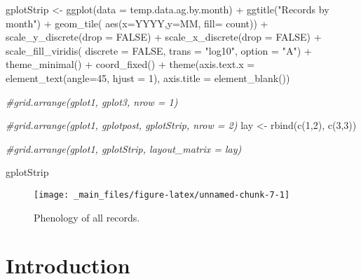 \documentclass[
]{article}
\newenvironment{Shaded}{\begin{snugshade}}{\end{snugshade}}
\newcommand{\AttributeTok}[1]{\textcolor[rgb]{0.77,0.63,0.00}{#1}}
\newcommand{\CommentTok}[1]{\textcolor[rgb]{0.56,0.35,0.01}{\textit{#1}}}
\newcommand{\ConstantTok}[1]{\textcolor[rgb]{0.00,0.00,0.00}{#1}}
\newcommand{\DecValTok}[1]{\textcolor[rgb]{0.00,0.00,0.81}{#1}}
\newcommand{\FunctionTok}[1]{\textcolor[rgb]{0.00,0.00,0.00}{#1}}
\newcommand{\NormalTok}[1]{#1}
\newcommand{\OtherTok}[1]{\textcolor[rgb]{0.56,0.35,0.01}{#1}}
\newcommand{\SpecialCharTok}[1]{\textcolor[rgb]{0.00,0.00,0.00}{#1}}
\newcommand{\StringTok}[1]{\textcolor[rgb]{0.31,0.60,0.02}{#1}}
\begin{document}
\begin{Shaded}
\begin{Highlighting}[]
\NormalTok{gplotStrip }\OtherTok{\textless{}{-}} \FunctionTok{ggplot}\NormalTok{(}\AttributeTok{data =}\NormalTok{ temp.data.ag.by.month)  }\SpecialCharTok{+}
    \FunctionTok{ggtitle}\NormalTok{(}\StringTok{"Records by month"}\NormalTok{) }\SpecialCharTok{+}
  \FunctionTok{geom\_tile}\NormalTok{( }
                      \FunctionTok{aes}\NormalTok{(}\AttributeTok{x=}\NormalTok{YYYY,}\AttributeTok{y=}\NormalTok{MM, }\AttributeTok{fill=}\NormalTok{ count))  }\SpecialCharTok{+}
   \FunctionTok{scale\_y\_discrete}\NormalTok{(}\AttributeTok{drop =} \ConstantTok{FALSE}\NormalTok{) }\SpecialCharTok{+} 
  \FunctionTok{scale\_x\_discrete}\NormalTok{(}\AttributeTok{drop =} \ConstantTok{FALSE}\NormalTok{) }\SpecialCharTok{+} 
  \FunctionTok{scale\_fill\_viridis}\NormalTok{( }\AttributeTok{discrete =} \ConstantTok{FALSE}\NormalTok{, }\AttributeTok{trans =} \StringTok{"log10"}\NormalTok{, }\AttributeTok{option =} \StringTok{"A"}\NormalTok{) }\SpecialCharTok{+} 
  \FunctionTok{theme\_minimal}\NormalTok{() }\SpecialCharTok{+}  \FunctionTok{coord\_fixed}\NormalTok{() }\SpecialCharTok{+}
  \FunctionTok{theme}\NormalTok{(}\AttributeTok{axis.text.x  =} \FunctionTok{element\_text}\NormalTok{(}\AttributeTok{angle=}\DecValTok{45}\NormalTok{, }\AttributeTok{hjust =} \DecValTok{1}\NormalTok{),}
        \AttributeTok{axis.title =} \FunctionTok{element\_blank}\NormalTok{())}

\CommentTok{\#grid.arrange(gplot1, gplot3, nrow = 1)}

\CommentTok{\#grid.arrange(gplot1, gplotpost, gplotStrip, nrow = 2)}
\NormalTok{lay }\OtherTok{\textless{}{-}} \FunctionTok{rbind}\NormalTok{(}\FunctionTok{c}\NormalTok{(}\DecValTok{1}\NormalTok{,}\DecValTok{2}\NormalTok{),}
             \FunctionTok{c}\NormalTok{(}\DecValTok{3}\NormalTok{,}\DecValTok{3}\NormalTok{))}

\CommentTok{\#grid.arrange(gplot1,  gplotStrip, layout\_matrix = lay)}

\NormalTok{gplotStrip}
\end{Highlighting}
\end{Shaded}

\begin{figure}

{\centering \texttt{[image: \_main\_files/figure-latex/unnamed-chunk-7-1]} 

}

\caption{Phenology of all records.}\label{fig:unnamed-chunk-7}
\end{figure}

\hypertarget{introduction}{%
\section{Introduction}\label{introduction}}
\end{document}
